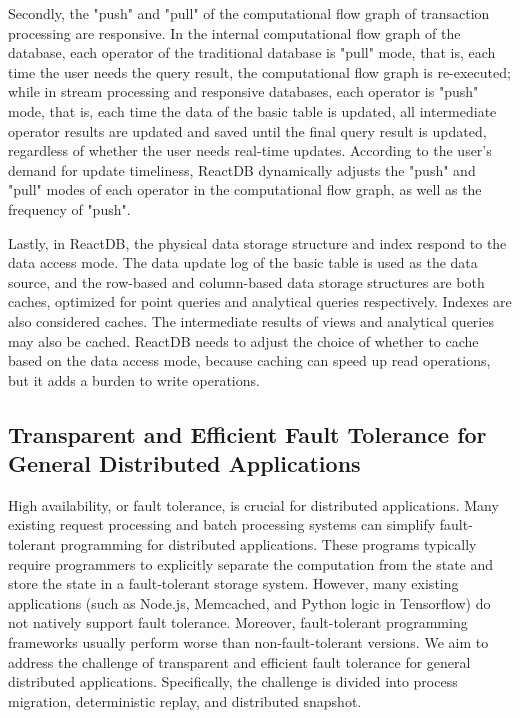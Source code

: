 Secondly, the "push" and "pull" of the computational flow graph of transaction processing are responsive. In the internal computational flow graph of the database, each operator of the traditional database is "pull" mode, that is, each time the user needs the query result, the computational flow graph is re-executed; while in stream processing and responsive databases, each operator is "push" mode, that is, each time the data of the basic table is updated, all intermediate operator results are updated and saved until the final query result is updated, regardless of whether the user needs real-time updates. According to the user's demand for update timeliness, ReactDB dynamically adjusts the "push" and "pull" modes of each operator in the computational flow graph, as well as the frequency of "push".

Lastly, in ReactDB, the physical data storage structure and index respond to the data access mode. The data update log of the basic table is used as the data source, and the row-based and column-based data storage structures are both caches, optimized for point queries and analytical queries respectively. Indexes are also considered caches. The intermediate results of views and analytical queries may also be cached. ReactDB needs to adjust the choice of whether to cache based on the data access mode, because caching can speed up read operations, but it adds a burden to write operations.

\subsection{Transparent and Efficient Fault Tolerance for General Distributed Applications}

High availability, or fault tolerance, is crucial for distributed applications. Many existing request processing and batch processing systems can simplify fault-tolerant programming for distributed applications. These programs typically require programmers to explicitly separate the computation from the state and store the state in a fault-tolerant storage system. However, many existing applications (such as Node.js, Memcached, and Python logic in Tensorflow) do not natively support fault tolerance. Moreover, fault-tolerant programming frameworks usually perform worse than non-fault-tolerant versions. We aim to address the challenge of transparent and efficient fault tolerance for general distributed applications. Specifically, the challenge is divided into process migration, deterministic replay, and distributed snapshot.

